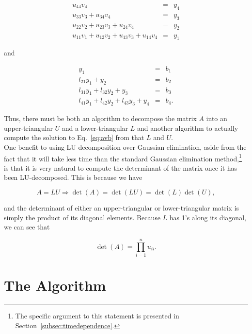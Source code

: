 \documentclass[12pt]{article}
\numberwithin{equation}{section}
\begin{document}
$$\begin{array}{rcc} u_{44}v_{4}&=&y_{4} \\
u_{33}v_{3}+u_{34}v_{4}&=&y_{3} \\
u_{22}v_{2}+u_{23}v_{3}+u_{24}v_{4}&=&y_{2} \\
u_{11}v_{1}+u_{12}v_{2}+u_{13}v_{3}+u_{14}v_{4}&=& y_{1} \end{array}$$

\noindent and

$$\begin{array}{rcc}y_{1}&=&b_{1} \\
l_{21}y_{1}+y_{2}&=&b_{2} \\
l_{31}y_{1}+l_{32}y_{2}+y_{3}&=&b_{3} \\
l_{41}y_{1}+l_{42}y_{2}+l_{43}y_{3}+y_{4}&=&b_{4}.\end{array}$$

\noindent Thus, there must be both an algorithm to decompose the matrix $A$ into an upper-triangular $U$ and a lower-triangular $L$ and another algorithm to actually compute the solution to Eq.~\ref{eq:avb} from that $L$ and $U$.
\\\indent One benefit to using LU decomposition over Gaussian elimination, aside from the fact that it will take less time than the standard Gaussian elimination method,\footnote{The specific argument to this statement is presented in Section~\ref{subsec:timedependence}.}  is that it is very natural to compute the determinant of the matrix once it has been LU-decomposed.  This is because we have 

$$A=LU \Rightarrow \det\left(A\right)=\det\left(LU\right)=\det\left(L\right)\det\left(U\right),$$

\noindent and the determinant of either an upper-triangular or lower-triangular matrix is simply the product of its diagonal elements.  Because $L$ has 1's along its diagonal, we can see that

\begin{equation}
\det\left(A\right)=\prod_{i=1}^{n}u_{ii}.
\end{equation}

\section{The Algorithm}
\label{sec:algorithm}
\end{document}
